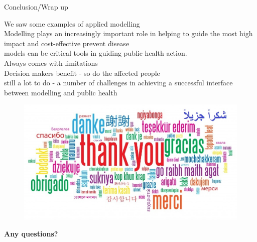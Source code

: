 \documentclass[table]{beamer}\usepackage[]{graphicx}\usepackage[]{color}
\newcommand\unnumbered{\setbeamertemplate{footline}{}}
\begin{document}
\begin{frame}[fragile]{Conclusion/Wrap up}

We saw some examples of applied modelling \\
\vspace{0.3cm}
Modelling plays an increasingly important role in helping to guide the most high impact and cost-effective prevent disease \\
\vspace{0.3cm}
models can be critical tools in guiding public health action. \\
\vspace{0.3cm}
Always comes with limitations \\ %
\vspace{0.3cm}
Decision makers benefit - so do the affected people \\
\vspace{0.3cm}
still a lot to do - a number of challenges in achieving a successful interface between modelling and public health

\end{frame}


{\unnumbered
\begin{frame}[noframenumbering]{}
\begin{center}
\begin{figure}
  \centering
  \includegraphics[width=\textwidth,height=0.5\textheight,keepaspectratio]{Thank-you-word-cloud.jpg}
\end{figure}

\pause \Huge{\textbf{Any questions?}}

\end{center}
\end{frame}}
\end{document}
